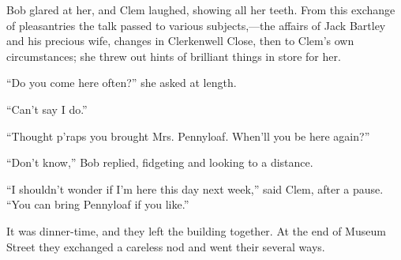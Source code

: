 Bob glared at her, and Clem laughed, showing all her teeth. From this
exchange of pleasantries the talk passed to various subjects,---the
affairs of Jack Bartley and his precious wife, changes in Clerkenwell
Close, then to Clem's own circumstances; she threw out hints of
brilliant things in store for her.

``Do you come here often?'' she asked at length.

``Can't say I do.''

``Thought p'raps you brought Mrs. Pennyloaf. When'll you be here
again?''

``Don't know,'' Bob replied, fidgeting and looking to a distance.

``I shouldn't wonder if I'm here this day next week,'' said Clem, after
a pause. ``You can bring Pennyloaf if you like.''

It was dinner-time, and they left the building together. At the end of
Museum Street they exchanged a careless nod and went their several ways.
